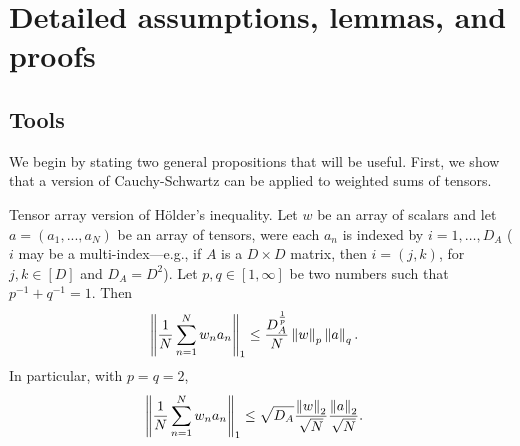 \newcommand{\globalassum}{Assumptions \ref{assu:paper_smoothness}---\ref{assu:paper_bounded} }

\section{Detailed assumptions, lemmas, and proofs\label{sec:appendix_proofs}}





\subsection{Tools}

We begin by stating two general propositions that will be useful.
First, we show that a version of Cauchy-Schwartz can be applied to
weighted sums of tensors.
%
\begin{prop}
\label{propref:tensor_cauchy_schwartz}Tensor array version of H{\"o}lder's
inequality. Let $w$ be an array of scalars and let $a=\left(a_{1},...,a_{N}\right)$
be an array of tensors, were each $a_{n}$ is indexed by $i=1,\ldots,D_{A}$
($i$ may be a multi-index---e.g., if $A$ is a $D\times D$ matrix,
then $i=\left(j,k\right)$, for $j,k\in\left[D\right]$ and $D_{A}=D^{2}$).
Let $p,q\in\left[1,\infty\right]$ be two numbers such that $p^{-1}+q^{-1}=1$.
Then
\begin{align*}
\left\Vert \frac{1}{N}\sum_{n=1}^{N}w_{n}a_{n}\right\Vert_{1} & \le\frac{D_{A}^{\frac{1}{p}}}{N}\left\Vert w\right\Vert_{p}\left\Vert a\right\Vert_{q}.
\end{align*}
In particular, with $p=q=2$,
\begin{align*}
\left\Vert \frac{1}{N}\sum_{n=1}^{N}w_{n}a_{n}\right\Vert_{1} & \le\sqrt{D_{A}}\frac{\left\Vert w\right\Vert_{2}}{\sqrt{N}}\frac{\left\Vert a\right\Vert_{2}}{\sqrt{N}}.
\end{align*}
\end{prop}
%
